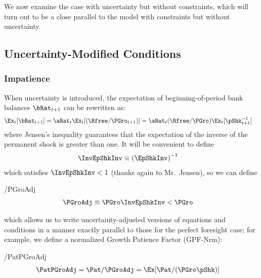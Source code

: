 \documentclass[ProjectDLO]{subfiles}
\begin{document}
We now examine the case with uncertainty but without constraints, which will turn out to be a close parallel to the model with constraints but without uncertainty.

\hypertarget{Uncertainty-Modified-Conditions}{}
\subsection{Uncertainty-Modified Conditions}\label{subsec:UncertaintyModifiedConditions}
\subsubsection{Impatience}

When uncertainty is introduced, the expectation of beginning-of-period bank balances $\bRat_{t+1}$ can be rewritten as:
\begin{align}
  \Ex_{t}[\bRat_{t+1}]  & =  \aRat_{t}\Ex_{t}[(\Rfree/\PGro_{t+1})] = \aRat_{t}(\Rfree/\PGro)\Ex_{t}[\pShk_{t+1}^{-1}] \label{eq:EbRat}
\end{align}
where Jensen's inequality guarantees that the expectation of the inverse of the permanent shock is greater than one.  It will be convenient to define\hypertarget{InvEpShkInv}{}
\begin{align}
  \InvEpShkInv  & \equiv  {(\EpShkInv)}^{-1} \label{eq:InvEpShkInv}
\end{align}
which satisfies $\InvEpShkInv < 1$ (thanks again to Mr.\ Jensen), so we can define
\begin{verbatimwrite}{\EqDir/PGroAdj}
\begin{align}
      \PGroAdj & \equiv \PGro \InvEpShkInv < \PGro \label{eq:PGroAdj}
\end{align}
\end{verbatimwrite}

which allows us to write uncertainty-adjusted versions of equations and conditions in a manner exactly parallel to those for the perfect foresight case; for example, we define a normalized Growth Patience Factor (GPF-Nrm):
\hypertarget{GICNrm}{}\hypertarget{GICNrmI}{}\hypertarget{PermGroAdj}{}
\begin{verbatimwrite}{\EqDir/PatPGroAdj}
  \begin{align}
    \PatPGroAdj  & = \Pat/\PGroAdj = \Ex[\Pat/(\PGro\pShk)]  \label{eq:GPFNrm}
  \end{align}
\end{verbatimwrite}

\end{document}
